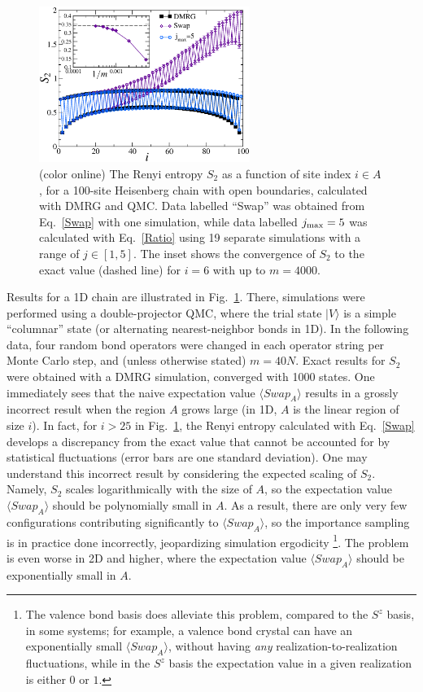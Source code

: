 \documentclass[prl,aps,twocolumn,floatfix,amsmath,amssymb,superscriptaddress,tightenlines]{revtex4}
\begin{document}
\begin{figure} {
\includegraphics[width=2.7in]{L100_fig2.eps} \caption{(color online) 
\label{1Dfig}
The Renyi entropy $S_2$ as a function of site index $i \in A$, for a 100-site Heisenberg chain with open boundaries, 
calculated with DMRG and QMC.  Data labelled ``Swap'' was obtained from Eq.~\eqref{Swap} with one simulation, while
data labelled $j_{\rm max}=5$ was calculated with Eq.~\eqref{Ratio} using 19 separate simulations with a range of  $j \in [1,5]$.  The inset shows the convergence of $S_2$ to the exact value (dashed line) for $i=6$ with up to $m=4000$.
}
} \end{figure}

Results for a 1D chain are illustrated in Fig.~\ref{1Dfig}.  There, simulations were performed using a double-projector QMC,  where
the trial state $| V \rangle$ is a simple ``columnar'' state (or alternating nearest-neighbor bonds in 1D).  In the following data, four random bond operators were changed in each operator string per Monte Carlo step, and (unless otherwise
stated) $m=40N$.  Exact results for $S_2$ were obtained with a DMRG simulation, converged with 1000 states.  One 
immediately sees that the naive expectation value $\langle Swap_A \rangle$ results in a grossly incorrect result when the region
$A$ grows large (in 1D, $A$ is the linear region of size $i$).   
In fact, for $i > 25$ in Fig.~\ref{1Dfig}, the Renyi entropy calculated with Eq.~\eqref{Swap} develops a discrepancy from the
exact value that cannot be accounted for by statistical fluctuations (error bars are one standard deviation).  
One may understand this incorrect result by considering the expected scaling of $S_2$.  Namely,
$S_2$ scales logarithmically with the size of $A$, so the expectation value
$\langle Swap_A \rangle$ should be polynomially small in $A$.  As a result, there
are only very
few configurations contributing significantly to $\langle Swap_A \rangle$, so the importance  sampling is in practice done incorrectly,
jeopardizing simulation ergodicity \footnote{The valence bond basis does alleviate this problem, compared to the
$S^z$ basis, in some systems; for example, a valence
bond crystal can have an exponentially small $\langle Swap_A \rangle$, without having {\it any} realization-to-realization fluctuations,
while in the $S^z$ basis the expectation value  in a given realization is either $0$ or $1$.}.
The problem is even worse in 2D and higher, where the expectation value 
$\langle Swap_A \rangle$ should be exponentially small in $A$.
\end{document}
